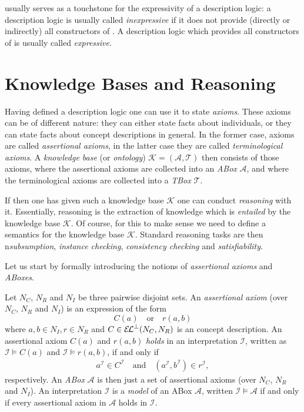 \ALC usually serves as a touchstone for the expressivity of a description logic: a
description logic is usually called \emph{inexpressive} if it does not provide (directly
or indirectly) all constructors of \ALC.  A description logic which provides all
constructors of \ALC is usually called \emph{expressive}.

\section{Knowledge Bases and Reasoning}
\label{sec:knowledge-bases}

Having defined a description logic one can use it to state \emph{axioms}.  These axioms
can be of different nature: they can either state facts about individuals, or they can
state facts about concept descriptions in general.  In the former case, axioms are called
\emph{assertional axioms}, in the latter case they are called \emph{terminological
  axioms}.  A \emph{knowledge base} (or \emph{ontology}) $\mathcal{K} = (\mathcal{A},
\mathcal{T})$ then consists of those axioms, where the assertional axioms are collected
into an \emph{ABox} $\mathcal{A}$, and where the terminological axioms are collected into
a \emph{TBox} $\mathcal{T}$.

If then one has given such a knowledge base $\mathcal{K}$ one can conduct \emph{reasoning}
with it.  Essentially, reasoning is the extraction of knowledge which is \emph{entailed}
by the knowledge base $\mathcal{K}$.  Of course, for this to make sense we need to define
a semantics for the knowledge base $\mathcal{K}$.  Standard reasoning tasks are then
n\emph{subsumption}, \emph{instance checking}, \emph{consistency checking} and
\emph{satisfiability}.

Let us start by formally introducing the notions of \emph{assertional axioms} and
\emph{ABoxes}.

\begin{Definition}
  \label{def:assertional-axiom-and-ABox}
  Let $N_C$, $N_R$ and $N_I$ be three pairwise disjoint sets.  An \emph{assertional axiom}
  (over $N_C$, $N_R$ and $N_I$) is an expression of the form
  \begin{equation*}
    C(a) \quad\text{or}\quad r(a, b)
  \end{equation*}
  where $a, b \in N_I, r \in N_R$ and $C \in {\ensuremath{{\mathcal{E}\kern-.3ex\mathcal{L}}^\bot}}(N_C, N_R)$ is an \ELbot concept
  description.  An assertional axiom $C(a)$ and $r(a,b)$ \emph{holds} in an interpretation
  $\mathcal{I}$, written as $\mathcal{I} \models C(a)$ and $\mathcal{I} \models r(a, b)$,
  if and only if
  \begin{align*}
    a^{\mathcal{I}} \in C^{\mathcal{I}} \quad\text{and}\quad (a^{\mathcal{I}},
    b^{\mathcal{I}}) \in r^{\mathcal{I}},
  \end{align*}
  respectively.  An \emph{ABox} $\mathcal{A}$ is then just a set of assertional axioms
  (over $N_C$, $N_R$ and $N_I$).  An interpretation $\mathcal{I}$ is a \emph{model} of an
  ABox $\mathcal{A}$, written $\mathcal{I} \models \mathcal{A}$ if and only if every
  assertional axiom in $\mathcal{A}$ holds in $\mathcal{I}$.
\end{Definition}

